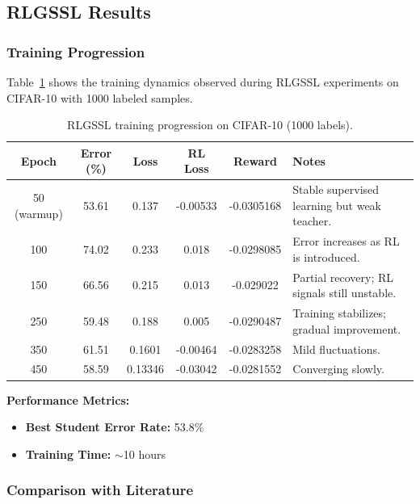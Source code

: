 \documentclass{scrartcl}
\begin{document}
\subsection{RLGSSL Results}

\subsubsection{Training Progression}

Table~\ref{tab:rlgssl_training} shows the training dynamics observed during RLGSSL experiments on CIFAR-10 with 1000 labeled samples.

\begin{table}[H]
    \centering
    \begin{tabular}{cccccl}
        \hline
        \textbf{Epoch} & \textbf{Error (\%)} & \textbf{Loss} & \textbf{RL Loss} & \textbf{Reward} & \textbf{Notes} \\
        \hline
        50 (warmup) & 53.61 & 0.137 & -0.00533 & -0.0305168 & Stable supervised learning but weak teacher. \\
        100 & 74.02 & 0.233 & 0.018 & -0.0298085 & Error increases as RL is introduced. \\
        150 & 66.56 & 0.215 & 0.013 & -0.029022 & Partial recovery; RL signals still unstable. \\
        250 & 59.48 & 0.188 & 0.005 & -0.0290487 & Training stabilizes; gradual improvement. \\
        350 & 61.51 & 0.1601 & -0.00464 & -0.0283258 & Mild fluctuations. \\
        450 & 58.59 & 0.13346 & -0.03042 & -0.0281552 & Converging slowly. \\
        \hline
    \end{tabular}
    \caption{RLGSSL training progression on CIFAR-10 (1000 labels).}
    \label{tab:rlgssl_training}
\end{table}



\textbf{Performance Metrics:}
\begin{itemize}
    \item \textbf{Best Student Error Rate:} 53.8\%
    \item \textbf{Training Time:} $\sim$10 hours
\end{itemize}

\subsubsection{Comparison with Literature}
\end{document}
